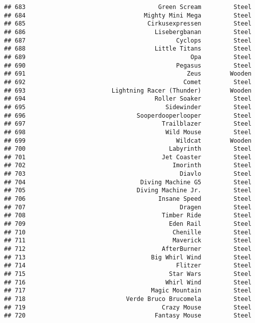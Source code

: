 \documentclass[
]{article}
\begin{document}
\begin{verbatim}
## 683                                     Green Scream         Steel
## 684                                 Mighty Mini Mega         Steel
## 685                                  Cirkusexpressen         Steel
## 686                                    Lisebergbanan         Steel
## 687                                          Cyclops         Steel
## 688                                    Little Titans         Steel
## 689                                              Opa         Steel
## 690                                          Pegasus         Steel
## 691                                             Zeus        Wooden
## 692                                            Comet         Steel
## 693                        Lightning Racer (Thunder)        Wooden
## 694                                    Roller Soaker         Steel
## 695                                       Sidewinder         Steel
## 696                               Sooperdooperlooper         Steel
## 697                                      Trailblazer         Steel
## 698                                       Wild Mouse         Steel
## 699                                          Wildcat        Wooden
## 700                                        Labyrinth         Steel
## 701                                      Jet Coaster         Steel
## 702                                         Imorinth         Steel
## 703                                           Diavlo         Steel
## 704                                Diving Machine G5         Steel
## 705                               Diving Machine Jr.         Steel
## 706                                     Insane Speed         Steel
## 707                                           Dragen         Steel
## 708                                      Timber Ride         Steel
## 709                                        Eden Rail         Steel
## 710                                         Chenille         Steel
## 711                                         Maverick         Steel
## 712                                      AfterBurner         Steel
## 713                                   Big Whirl Wind         Steel
## 714                                          Flitzer         Steel
## 715                                        Star Wars         Steel
## 716                                       Whirl Wind         Steel
## 717                                   Magic Mountain         Steel
## 718                            Verde Bruco Brucomela         Steel
## 719                                      Crazy Mouse         Steel
## 720                                    Fantasy Mouse         Steel

\end{verbatim}
\end{document}
